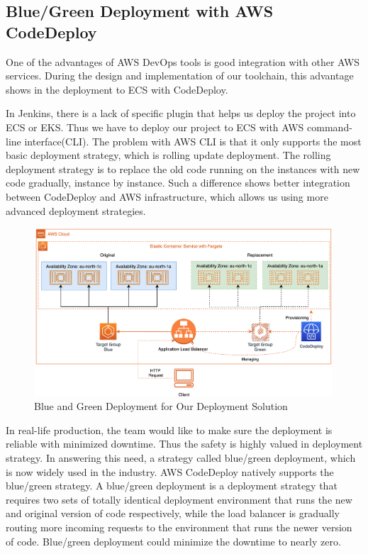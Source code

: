 \subsection{Blue/Green Deployment with AWS CodeDeploy}
One of the advantages of AWS DevOps tools is good integration with other AWS services. During the design and implementation of our toolchain, this advantage shows in the deployment to ECS with CodeDeploy.
\par
In Jenkins, there is a lack of specific plugin that helps us deploy the project into ECS or EKS. Thus we have to deploy our project to ECS with AWS command-line interface(CLI). The problem with AWS CLI is that it only supports the most basic deployment strategy, which is rolling update deployment. The rolling deployment strategy is to replace the old code running on the instances with new code gradually, instance by instance.
Such a difference shows better integration between CodeDeploy and AWS infrastructure, which allows us using more advanced deployment strategies. 
\begin{figure}[h]
 \centering
 \includegraphics[width=0.99\textwidth]{pics/bg.png}
 \caption{Blue and Green Deployment for Our Deployment Solution}
 \label{fig:bg}
\end{figure}
\par
In real-life production, the team would like to make sure the deployment is reliable with minimized downtime. Thus the safety is highly valued in deployment strategy. In answering this need, a strategy called blue/green deployment, which is now widely used in the industry. AWS CodeDeploy natively supports the blue/green strategy.
A blue/green deployment is a deployment strategy that requires two sets of totally identical deployment environment that runs the new and original version of code respectively, while the load balancer is gradually routing more incoming requests to the environment that runs the newer version of code. Blue/green deployment could minimize the downtime to nearly zero\cite{10.1007/978-3-030-45989-5_6}.
